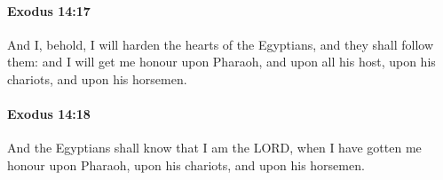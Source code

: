 		\paragraph{Exodus 14:17} %
			\label{EXODUS-14-17}

			And I, behold, I will harden the hearts of the Egyptians, and they shall follow them: and I will get me honour upon Pharaoh, and upon all his host, upon his chariots, and upon his horsemen.


		\paragraph{Exodus 14:18} %
			\label{EXODUS-14-18}

			And the Egyptians shall know that I am the LORD, when I have gotten me honour upon Pharaoh, upon his chariots, and upon his horsemen.


